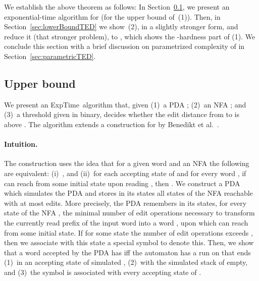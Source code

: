 \documentclass{CSML}
\newcommand{\EXPTIME}{\textsf{ExpTime}}
\begin{document}
We establish the above theorem as follows:
In Section~\ref{sec:upperBoundTED}, we present an exponential-time algorithm 
for  (for the upper bound of~(1)). 
Then, in Section~\ref{sec:lowerBoundTED} we show~(2), in a slightly stronger form, 
and reduce it (that stronger problem), to , which shows the -hardness 
part of (1).
We conclude this section with a brief discussion on parametrized complexity 
of  in Section~\ref{sec:parametricTED}.

\subsection{Upper bound}
\label{sec:upperBoundTED}

We present an \EXPTIME\ algorithm that, given (1)~a PDA ; 
(2)~an NFA ; and (3)~a threshold  given in  binary, decides whether 
the edit distance from  to  is above .
The algorithm extends a construction for  by Benedikt et al.~\cite{riveros}.

\paragraph{Intuition.}
The construction uses the idea that for a given word  and an NFA  
the following are equivalent: 
(i)~, and 
(ii)~for each accepting state  of  and for every word , if 
   can reach  from some initial state upon reading , then .
We construct a PDA  which simulates the PDA  and stores in its states all
states of the NFA  reachable with at most  edits. 
More precisely, the PDA  remembers in its states, for every state  of the NFA ,
the minimal number of edit operations necessary to transform the currently read prefix  of the input word 
into a word , upon which  can reach  from some initial state. 
If for some state the number of edit operations exceeds , 
then we associate with this state a special symbol  to denote this.
Then, we show that a word  accepted by the 
PDA  has  iff the automaton  has a run on 
that ends (1)~in an accepting state of simulated , 
(2)~with the simulated stack of  empty, and 
(3)~the symbol  is associated with every accepting state of .
\end{document}
